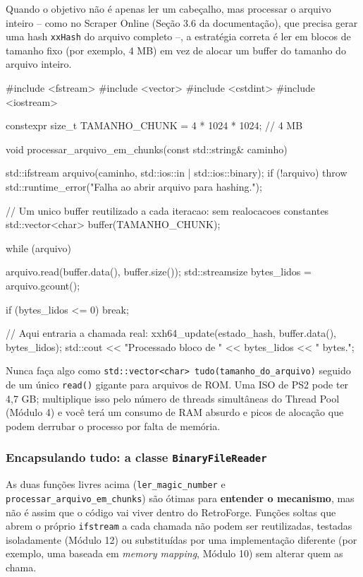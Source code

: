 Quando o objetivo não é apenas ler um cabeçalho, mas processar o arquivo inteiro -- como no Scraper Online (Seção 3.6 da documentação), que precisa gerar uma hash \texttt{xxHash} do arquivo completo --, a estratégia correta é ler em blocos de tamanho fixo (por exemplo, 4 MB) em vez de alocar um buffer do tamanho do arquivo inteiro.

\begin{CaixaCodigo}
#include <fstream>
#include <vector>
#include <cstdint>
#include <iostream>

constexpr size_t TAMANHO_CHUNK = 4 * 1024 * 1024; // 4 MB

void processar_arquivo_em_chunks(const std::string& caminho) {
    std::ifstream arquivo(caminho, std::ios::in | std::ios::binary);
    if (!arquivo) {
        throw std::runtime_error("Falha ao abrir arquivo para hashing.");
    }

    // Um unico buffer reutilizado a cada iteracao: sem realocacoes constantes
    std::vector<char> buffer(TAMANHO_CHUNK);

    while (arquivo) {
        arquivo.read(buffer.data(), buffer.size());
        std::streamsize bytes_lidos = arquivo.gcount();

        if (bytes_lidos <= 0) {
            break;
        }

        // Aqui entraria a chamada real: xxh64_update(estado_hash, buffer.data(), bytes_lidos);
        std::cout << "Processado bloco de " << bytes_lidos << " bytes.\n";
    }
}
\end{CaixaCodigo}

\begin{CaixaAlerta}
Nunca faça algo como \texttt{std::vector<char> tudo(tamanho\_do\_arquivo)} seguido de um único \texttt{read()} gigante para arquivos de ROM. Uma ISO de PS2 pode ter 4,7 GB; multiplique isso pelo número de threads simultâneas do Thread Pool (Módulo 4) e você terá um consumo de RAM absurdo e picos de alocação que podem derrubar o processo por falta de memória.
\end{CaixaAlerta}

\subsubsection{Encapsulando tudo: a classe \texttt{BinaryFileReader}}

As duas funções livres acima (\texttt{ler\_magic\_number} e \texttt{processar\_arquivo\_em\_chunks}) são ótimas para \textbf{entender o mecanismo}, mas não é assim que o código vai viver dentro do RetroForge. Funções soltas que abrem o próprio \texttt{ifstream} a cada chamada não podem ser reutilizadas, testadas isoladamente (Módulo 12) ou substituídas por uma implementação diferente (por exemplo, uma baseada em \textit{memory mapping}, Módulo 10) sem alterar quem as chama.

